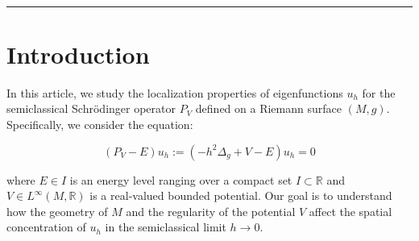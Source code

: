 \documentclass[leqno,11pt,letterpaper, english]{amsart}
\theoremstyle{plain}
\theoremstyle{definition}
\numberwithin{equation}{section}
\def\R{\mathbb R}
\begin{document}
\ \vskip -1cm \noindent\hfil\rule{0.9\textwidth}{.4pt}\hfil \vskip 1cm 
	\maketitle
	

\tableofcontents

\section{Introduction}	
	In this article, we study the localization properties of eigenfunctions $u_h$ for the semiclassical Schrödinger operator $P_V$ defined on a Riemann surface $(M,g)$. Specifically, we consider the equation:

	\begin{equation}
		\label{eq: Schrodinger equation}
		(P_V-E)u_h:= (-h^2\Delta_g +V- E)u_h=0
	\end{equation}

	where $E\in I$ is an energy level ranging over a compact set $I\subset \R$ and $V\in L^\infty(M,\R)$ is a real-valued bounded potential. Our goal is to understand how the geometry of $M$ and the regularity of the potential $V$ affect the spatial concentration of $u_h$ in the semiclassical limit $h \rightarrow 0$.


\end{document}
